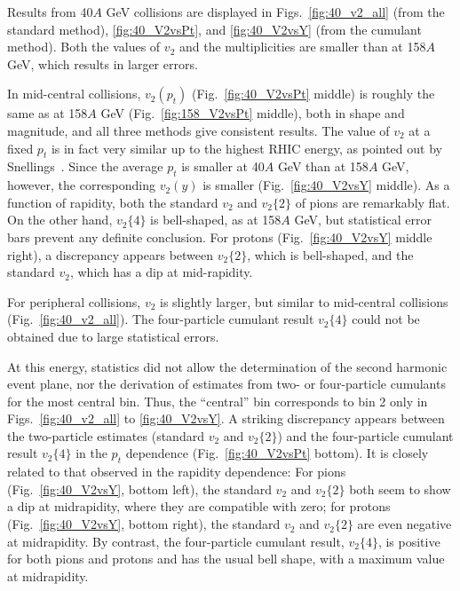 \documentclass[aps,prc,superscriptaddress,showpacs,floatfix,nofootinbib]{revtex4}
\begin{document}
Results from 40$A$ GeV collisions are displayed in
Figs.~\ref{fig:40_v2_all} (from the standard method),
\ref{fig:40_V2vsPt}, and \ref{fig:40_V2vsY} (from the cumulant
method). Both the values of $v_2$ and the multiplicities are
smaller than at 158$A$ GeV, which results in larger errors.

In mid-central collisions, $v_2(p_t)$ (Fig.~\ref{fig:40_V2vsPt}
middle) is roughly the same as at 158$A$ GeV
(Fig.~\ref{fig:158_V2vsPt} middle), both in shape and magnitude, and
all three methods give consistent results.  The value of $v_2$ at a
fixed $p_t$ is in fact very similar up to the highest RHIC energy,
as pointed out by Snellings~\cite{Snellings:2003mh}.  Since the
average $p_t$ is smaller at 40$A$ GeV than at 158$A$ GeV,
however, the corresponding $v_2(y)$ is smaller
(Fig.~\ref{fig:40_V2vsY} middle).  As a function of rapidity, both the
standard $v_2$ and $v_2\{2\}$ of pions are remarkably flat. On the
other hand, $v_2\{4\}$ is bell-shaped, as at 158$A$ GeV, but
statistical error bars prevent any definite conclusion.  For protons
(Fig.~\ref{fig:40_V2vsY} middle right), a discrepancy appears between
$v_2\{2\}$, which is bell-shaped, and the standard $v_2$, which has a
dip at mid-rapidity. %

For peripheral collisions, $v_2$ is slightly larger, but 
similar to mid-central collisions  (Fig.~\ref{fig:40_v2_all}). 
The four-particle cumulant result $v_2\{4\}$ could not be 
obtained due to large statistical errors.

At this energy, statistics did not allow the determination of the
second harmonic event plane, nor the derivation of estimates from two-
or four-particle cumulants for the most central bin.  Thus, the
``central'' bin corresponds to bin 2 only in
Figs.~\ref{fig:40_v2_all} to \ref{fig:40_V2vsY}.  A striking
discrepancy appears between the two-particle estimates (standard $v_2$
and $v_2\{2\}$) and the four-particle cumulant result $v_2\{4\}$
in the $p_t$ dependence (Fig.~\ref{fig:40_V2vsPt} bottom). It is
closely related to that observed in the rapidity dependence: For
pions (Fig.~\ref{fig:40_V2vsY}, bottom left), the standard $v_2$ and
$v_2\{2\}$ both seem to show a dip at midrapidity, where they are
compatible with zero; for protons (Fig.~\ref{fig:40_V2vsY},
bottom right), the standard $v_2$ and $v_2\{2\}$ are even negative at
midrapidity.  By contrast, the four-particle cumulant result,
$v_2\{4\}$, is positive for both pions and protons and has the usual
bell shape, with a maximum value at midrapidity.
\end{document}
